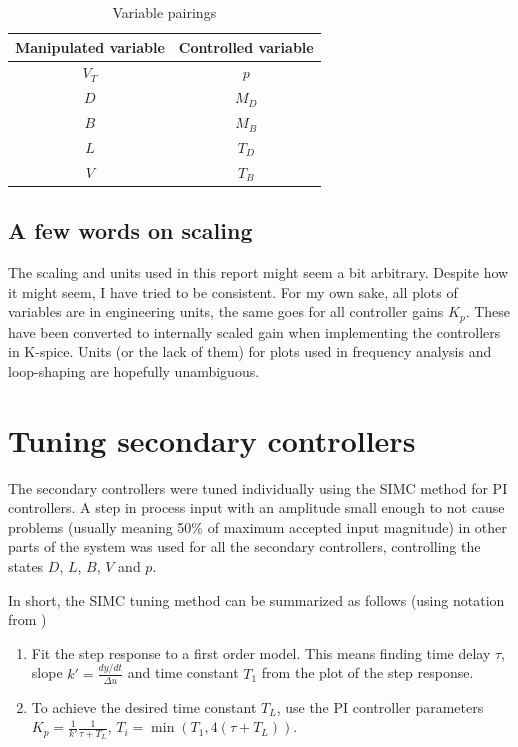 \documentclass[12pt]{article}
\begin{document}
\begin{table}[h]
\centering
\begin{tabular}{c|c}
Manipulated variable & Controlled variable \\ \hline
$V_T$ & $p$ \\
$D$ & $M_D$ \\
$B$ & $M_B$ \\
$L$ & $T_D$ \\
$V$ & $T_B$
\end{tabular}
\caption{Variable pairings}
\label{tab_pairings}
\end{table}

\subsection{A few words on scaling}
The scaling and units used in this report might seem a bit arbitrary. Despite how it might seem, I have tried to be consistent. For my own sake, all plots of variables are in engineering units, the same goes for all controller gains $K_p$. These have been converted to internally scaled gain when implementing the controllers in K-spice. Units (or the lack of them) for plots used in frequency analysis and loop-shaping are hopefully unambiguous.

\newpage
\section{Tuning secondary controllers}
The secondary controllers were tuned individually using the SIMC method for PI controllers. A step in process input with an amplitude small enough to not cause problems (usually meaning 50\% of maximum accepted input magnitude) in other parts of the system was used for all the secondary controllers, controlling the states $D$, $L$, $B$, $V$ and $p$.

In short, the SIMC tuning method can be summarized as follows (using notation from \cite{regtek}) 

\begin{enumerate}
\item Fit the step response to a first order model. This means finding time delay $\tau$, slope $k' = \frac{dy/dt}{\Delta u}$ and time constant $T_1$ from the plot of the step response.
\item To achieve the desired time constant $T_L$, use the PI controller parameters $K_p = \frac{1}{k'} \frac{1}{\tau + T_L}$, $T_i = \min(T_1, 4(\tau + T_L))$.
\end{enumerate}
\end{document}
